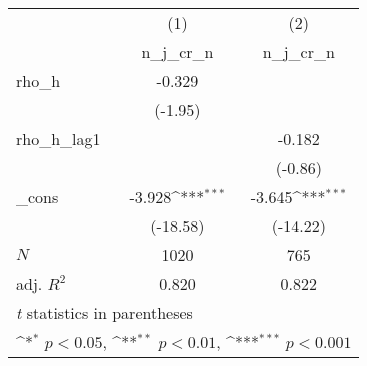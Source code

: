 {
\def\sym#1{\ifmmode^{#1}\else\(^{#1}\)\fi}
\begin{tabular}{l*{2}{c}}
\toprule
            &\multicolumn{1}{c}{(1)}&\multicolumn{1}{c}{(2)}\\
            &\multicolumn{1}{c}{n\_j\_cr\_n}&\multicolumn{1}{c}{n\_j\_cr\_n}\\
\midrule
rho\_h       &      -0.329         &                     \\
            &     (-1.95)         &                     \\
\addlinespace
rho\_h\_lag1  &                     &      -0.182         \\
            &                     &     (-0.86)         \\
\addlinespace
\_cons      &      -3.928\sym{***}&      -3.645\sym{***}\\
            &    (-18.58)         &    (-14.22)         \\
\midrule
\(N\)       &        1020         &         765         \\
adj. \(R^{2}\)&       0.820         &       0.822         \\
\bottomrule
\multicolumn{3}{l}{\footnotesize \textit{t} statistics in parentheses}\\
\multicolumn{3}{l}{\footnotesize \sym{*} \(p<0.05\), \sym{**} \(p<0.01\), \sym{***} \(p<0.001\)}\\
\end{tabular}
}
